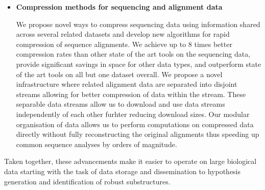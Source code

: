 \begin{itemize}
  \item \textbf{Compression methods for sequencing and alignment data}

  We propose novel ways to compress sequencing data using information shared across several related datasets and develop new algorithms for rapid compression of sequence alignments. We achieve up to 8 times better compression rates than other state of the art tools on the sequencing data, provide significant savings in space for other data types, and outperform state of the art tools on all but one dataset overall. We propose a novel infrastructure where related alignment data are separated into disjoint streams allowing for better compression of data within the stream. These separable data streams allow us to download and use data streams independently of each other furhter reducing download sizes. Our modular organisation of data allows us to perform computations on compressed data directly without fully reconstructing the original alignments thus speeding up common sequence analyses by orders of magnitude.

\end{itemize}

Taken together, these advancements make it easier to operate on large biological data starting with the task of data storage and dissemination to hypothesis generation and identification of robust substructures.